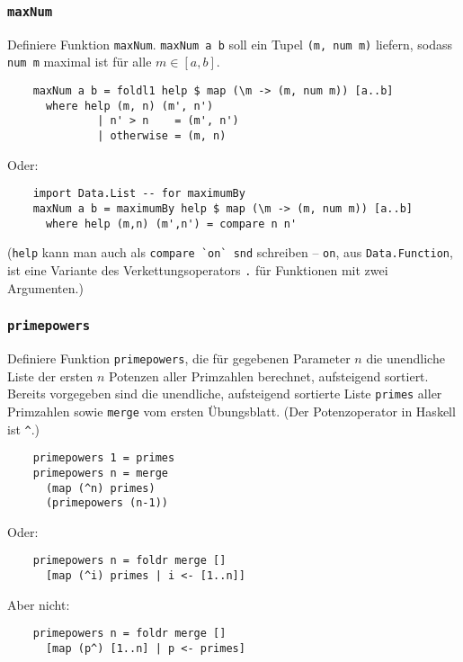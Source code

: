 \documentclass{beamer}
\begin{document}
\begin{frame}[fragile]
  \frametitle{\lstinline{maxNum}}
  Definiere Funktion \lstinline{maxNum}.
  \lstinline{maxNum a b} soll ein Tupel \lstinline{(m, num m)} liefern, sodass \lstinline{num m} maximal ist für alle $m ∈ [a,b]$.
  \pause
  \begin{lstlisting}
    maxNum a b = foldl1 help $ map (\m -> (m, num m)) [a..b]
      where help (m, n) (m', n')
              | n' > n    = (m', n')
              | otherwise = (m, n)
  \end{lstlisting}
  Oder:
  \begin{lstlisting}
    import Data.List -- for maximumBy
    maxNum a b = maximumBy help $ map (\m -> (m, num m)) [a..b]
      where help (m,n) (m',n') = compare n n'
  \end{lstlisting}
  (\lstinline{help} kann man auch als \lstinline{compare `on` snd} schreiben – \lstinline{on}, aus \lstinline{Data.Function}, ist eine Variante des Verkettungsoperators \lstinline{.} für Funktionen mit zwei Argumenten.)
\end{frame}

\begin{frame}[fragile]
  \frametitle{\lstinline{primepowers}}
  Definiere Funktion \lstinline{primepowers}, die für gegebenen Parameter $n$ die unendliche Liste der ersten $n$ Potenzen aller Primzahlen berechnet, aufsteigend sortiert.
  Bereits vorgegeben sind die unendliche, aufsteigend sortierte Liste \lstinline{primes} aller Primzahlen sowie \lstinline{merge} vom ersten Übungsblatt.
  (Der Potenzoperator in Haskell ist \lstinline{^}.)
  \pause
  \begin{lstlisting}
    primepowers 1 = primes
    primepowers n = merge
      (map (^n) primes)
      (primepowers (n-1))
  \end{lstlisting}
  Oder:
  \begin{lstlisting}
    primepowers n = foldr merge []
      [map (^i) primes | i <- [1..n]]
  \end{lstlisting}
  Aber nicht:
  \begin{lstlisting}
    primepowers n = foldr merge []
      [map (p^) [1..n] | p <- primes]
  \end{lstlisting}
\end{frame}
\end{document}
